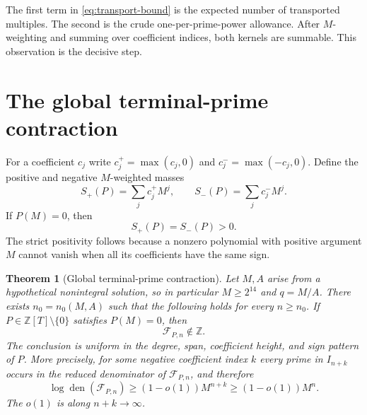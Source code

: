 \documentclass[11pt,oneside]{article}
\newtheorem{theorem}{Theorem}[section]
\theoremstyle{definition}
\theoremstyle{remark}
\newcommand{\Z}{\mathbb Z}
\newcommand{\den}{\operatorname{den}}
\newcommand{\FF}{\mathcal F}
\begin{document}
The first term in \eqref{eq:transport-bound} is the expected number of transported multiples.
The second is the crude one-per-prime-power allowance.  After $M$-weighting and summing over
coefficient indices, both kernels are summable.  This observation is the decisive step.

\section{The global terminal-prime contraction}
\label{sec:contraction}

For a coefficient $c_j$ write $c_j^+=\max(c_j,0)$ and
$c_j^-=\max(-c_j,0)$.  Define the positive and negative $M$-weighted masses
\[
 S_+(P)=\sum_jc_j^+M^j,
 \qquad
 S_-(P)=\sum_jc_j^-M^j.
\]
If $P(M)=0$, then
\begin{equation}
 S_+(P)=S_-(P)>0.                              \label{eq:mass-balance}
\end{equation}
The strict positivity follows because a nonzero polynomial with positive argument $M$ cannot
vanish when all its coefficients have the same sign.

\begin{theorem}[Global terminal-prime contraction]
\label{thm:global-contraction}
Let $M,A$ arise from a hypothetical nonintegral solution, so in particular $M\ge2^{14}$ and
$q=M/A$.  There exists $n_0=n_0(M,A)$ such that the following holds for every $n\ge n_0$.
If $P\in\Z[T]\setminus\{0\}$ satisfies $P(M)=0$, then
\[
 \FF_{P,n}\notin\Z.
\]
The conclusion is uniform in the degree, span, coefficient height, and sign pattern of $P$.
More precisely, for some negative coefficient index $k$ every prime in $I_{n+k}$ occurs in
the reduced denominator of $\FF_{P,n}$, and therefore
\begin{equation}
 \log\den(\FF_{P,n})\ge(1-o(1))M^{n+k}\ge(1-o(1))M^n. \label{eq:global-den-lower}
\end{equation}
The $o(1)$ is along $n+k\to\infty$.
\end{theorem}
\end{document}

